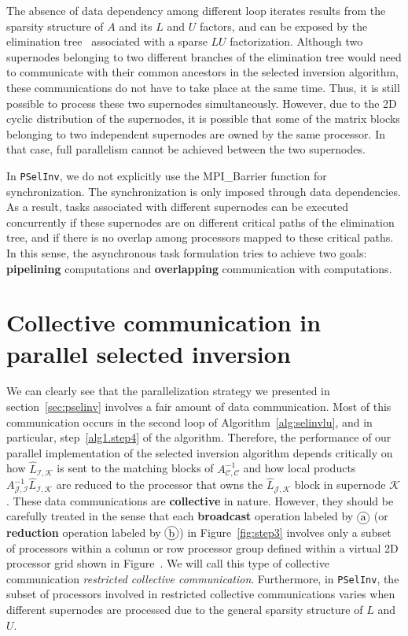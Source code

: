 \documentclass{acm_proc_article-sp}
\DeclareRobustCommand\circled[1]{\tikz[baseline=(char.base)]{ \node[shape=circle, fill=white,draw,inner sep=0pt,text width= 1 em ,minimum size = 1 em, text centered] (char) {#1};}}
\newcommand{\CS}{\ensuremath{\mathcal C}\xspace}
\newcommand{\JS}{\ensuremath{\mathcal J}\xspace}
\newcommand{\IS}{\ensuremath{\mathcal I}\xspace}
\newcommand{\KS}{\ensuremath{\mathcal K}\xspace}
\newcommand{\pselinv}{\texttt{PSelInv}\xspace}
\begin{document}
The absence of data dependency among different loop iterates 
results from the sparsity structure of $A$ and its $L$ and $U$ 
factors, and can be exposed by the elimination tree~\cite{Liu1990} 
associated with a sparse $LU$ factorization. Although two supernodes 
belonging to two different branches of the elimination tree would need 
to communicate with their common ancestors in the selected inversion
algorithm, these communications do not have to take place at the same time.
Thus, it is still possible to process these two supernodes simultaneously.
However, due to the 2D cyclic distribution of the supernodes,
it is possible that some of the matrix blocks belonging to two
independent supernodes are owned by the same processor. In that
case, full parallelism cannot be achieved between the two supernodes.


In \pselinv, we do not explicitly use the MPI\_Barrier function 
for synchronization. The synchronization is only imposed through
data dependencies. As a result, tasks associated with different
supernodes can be executed concurrently if these supernodes are on
different critical paths of the elimination tree, and if there is no
overlap among processors mapped to these critical paths. In this sense,
the asynchronous task formulation tries to achieve two goals:
\textbf{pipelining} computations and \textbf{overlapping} communication
with computations. 

\section{Collective communication in \newline parallel selected inversion}\label{sec:comm}



We can clearly see that the parallelization strategy we presented
in section~\ref{sec:pselinv} involves a fair amount of data communication.
Most of this communication occurs in the second loop of 
Algorithm~\ref{alg:selinvlu}, and in particular, step~\ref{alg1.step4} of 
the algorithm.
Therefore, the performance of our parallel implementation of the 
selected inversion algorithm depends critically on how
$\hat{L}_{\IS,\KS}$ is sent to the matching blocks of $A_{\CS,\CS}^{-1}$ 
and how local products $A^{-1}_{\JS,\IS}\hat{L}_{\IS,\KS}$ are reduced 
to the processor that owns the $\hat{L}_{\JS,\KS}$ block in supernode $\KS$.
These data communications are \textbf{collective} in nature.  
However, they should be carefully treated in the sense that each \textbf{broadcast} 
operation labeled by $\circled{a}$ 
(or \textbf{reduction} operation labeled by $\circled{b}$) in
Figure~\ref{fig:step3} involves only a subset of processors 
within a column or row processor group defined within a 
virtual 2D processor grid shown in Figure~.
We will call this type of collective communication {\em restricted
collective communication}. Furthermore, in \pselinv, the subset of 
processors involved in restricted collective communications
varies when different supernodes are processed
due to the general sparsity structure of $L$ and $U$.
\end{document}
